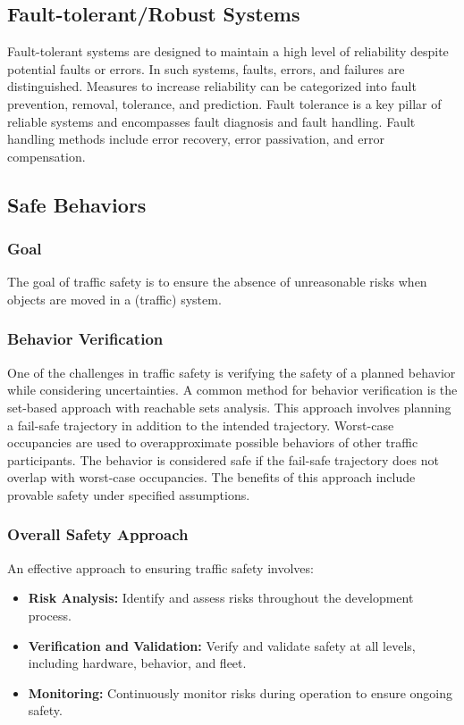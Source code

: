 \subsection{Fault-tolerant/Robust Systems}

Fault-tolerant systems are designed to maintain a high level of reliability despite potential faults or errors. In such systems, faults, errors, and failures are distinguished. Measures to increase reliability can be categorized into fault prevention, removal, tolerance, and prediction. Fault tolerance is a key pillar of reliable systems and encompasses fault diagnosis and fault handling. Fault handling methods include error recovery, error passivation, and error compensation.

\subsection{Safe Behaviors}

\subsubsection*{Goal}
The goal of traffic safety is to ensure the absence of unreasonable risks when objects are moved in a (traffic) system.

\subsubsection*{Behavior Verification}
One of the challenges in traffic safety is verifying the safety of a planned behavior while considering uncertainties. A common method for behavior verification is the set-based approach with reachable sets analysis. This approach involves planning a fail-safe trajectory in addition to the intended trajectory. Worst-case occupancies are used to overapproximate possible behaviors of other traffic participants. The behavior is considered safe if the fail-safe trajectory does not overlap with worst-case occupancies. The benefits of this approach include provable safety under specified assumptions.

\subsubsection*{Overall Safety Approach}
An effective approach to ensuring traffic safety involves:
\begin{itemize}
    \item \textbf{Risk Analysis:} Identify and assess risks throughout the development process.
    \item \textbf{Verification and Validation:} Verify and validate safety at all levels, including hardware, behavior, and fleet.
    \item \textbf{Monitoring:} Continuously monitor risks during operation to ensure ongoing safety.
\end{itemize}

